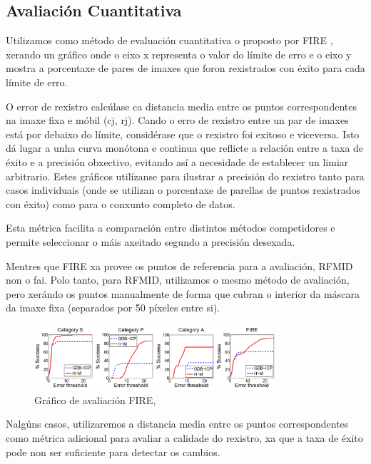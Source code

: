  \subsection{Avaliación Cuantitativa}
 \label{subsec:Avaliación Cuantitativa}
 
 Utilizamos como método de evaluación cuantitativa o proposto por FIRE \cite{FIRE},
 xerando un gráfico onde o eixo x representa o valor do límite de erro e o eixo y mostra a porcentaxe de pares de imaxes que foron rexistrados con éxito para cada límite de erro.
 
 O error de rexistro calcúlase ca distancia media entre os puntos correspondentes na imaxe fixa e móbil (cj, rj).
 Cando o erro de rexistro entre un par de imaxes está por debaixo do límite, considérase que o rexistro foi exitoso e viceversa. Isto dá lugar a unha curva monótona e continua que reflicte a relación entre a taxa de éxito e a precisión obxectivo, evitando así a necesidade de establecer un limiar arbitrario. 
 Estes gráficos utilízanse para ilustrar a precisión do rexistro tanto para casos individuais (onde se utilizan o porcentaxe de parellas de puntos rexistrados con éxito)
  como para o conxunto completo de datos.
 
Esta métrica facilita a comparación entre distintos métodos competidores e permite seleccionar o máis axeitado segundo a precisión desexada.
 
 Mentres que FIRE xa provee os puntos de referencia para a avaliación, RFMID non o fai.
 Polo tanto, para RFMID, utilizamos o mesmo método de avaliación, pero xerándo os puntos manualmente de forma que cubran o interior da máscara da imaxe fixa (separados por 50 píxeles entre si).
 
 \begin{figure}[ht]
    \centering
    \includegraphics[width=0.8\textwidth]{imaxes/fire_aval.png}
    \caption{Gráfico de avaliación FIRE, \cite{FIRE}}
    \label{fig:fire_aval}
\end{figure}

Nalgúns casos, utilizaremos a distancia media entre os puntos correspondentes como métrica adicional para avaliar a calidade do rexistro, xa que a taxa de éxito pode non ser suficiente para detectar os cambios.

